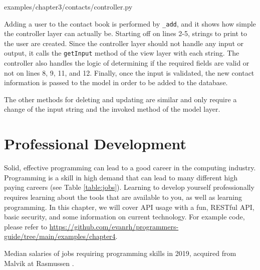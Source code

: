 \documentclass[12pt, oneside, a4paper]{book}
\begin{document}
      
      {examples/chapter3/contacts/controller.py}

      Adding a user to the contact book is performed by \lstinline!_add!, and it shows how simple the controller layer can actually be.
      Starting off on lines 2-5, strings to print to the user are created.
      Since the controller layer should not handle any input or output, it calls the \lstinline!getInput! method of the view layer with each string.
      The controller also handles the logic of determining if the required fields are valid or not on lines 8, 9, 11, and 12.
      Finally, once the input is validated, the new contact information is passed to the model in order to be added to the database.

      The other methods for deleting and updating are similar and only require a change of the input string and the invoked method of the model layer.
   \chapter{Professional Development}
   \label{chap:prof_devel}
      Solid, effective programming can lead to a good career in the computing industry.
      Programming is a skill in high demand that can lead to many different high paying careers (see Table \ref*{table:jobs}).
      Learning to develop yourself professionally requires learning about the tools that are available to you, as well as learning programming.
      In this chapter, we will cover API usage with a fun, RESTful API, basic security, and some information on current technology.
      For example code, please refer to \url{https://github.com/evanrh/programmers-guide/tree/main/examples/chapter4}.
      \begin{table}[H]
         \caption{
            Median salaries of jobs requiring programming skills in 2019, acquired from Malvik at Rasmussen \autocite{malvikProgrammingCareersCoding}.
         }
         \label{table:jobs}
      \end{table}
\end{document}
